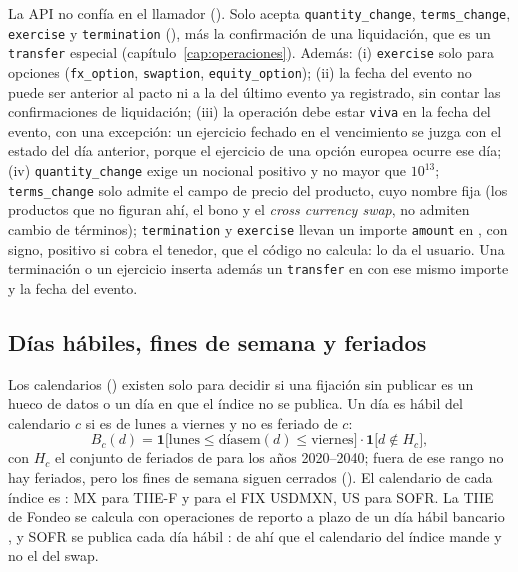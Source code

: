 La API no confía en el llamador (). Solo acepta \texttt{quantity\_change}, \texttt{terms\_change}, \texttt{exercise} y \texttt{termination} (), más la confirmación de una liquidación, que es un \texttt{transfer} especial (capítulo~\ref{cap:operaciones}). Además: (i) \texttt{exercise} solo para opciones (\texttt{fx\_option}, \texttt{swaption}, \texttt{equity\_option}); (ii) la fecha del evento no puede ser anterior al pacto ni a la del último evento ya registrado, sin contar las confirmaciones de liquidación; (iii) la operación debe estar \texttt{viva} en la fecha del evento, con una excepción: un ejercicio fechado en el vencimiento se juzga con el estado del día anterior, porque el ejercicio de una opción europea ocurre ese día; (iv) \texttt{quantity\_change} exige un nocional positivo y no mayor que $10^{13}$; \texttt{terms\_change} solo admite el campo de precio del producto, cuyo nombre fija  (los productos que no figuran ahí, el bono y el \emph{cross currency swap}, no admiten cambio de términos); \texttt{termination} y \texttt{exercise} llevan un importe \texttt{amount} en \MXN, con signo, positivo si cobra el tenedor, que el código no calcula: lo da el usuario. Una terminación o un ejercicio inserta además un \texttt{transfer} en \MXN con ese mismo importe y la fecha del evento.

\subsection{Días hábiles, fines de semana y feriados}\label{sec:cap08-habiles}

Los calendarios () existen solo para decidir si una fijación sin publicar es un hueco de datos o un día en que el índice no se publica. Un día es hábil del calendario $c$ si es de lunes a viernes y no es feriado de $c$:
\begin{equation}\label{eq:cap08-habil}
  B_c(d) = \mathbf{1}\bigl[\text{lunes} \le \text{díasem}(d) \le \text{viernes}\bigr]\cdot\mathbf{1}\bigl[d \notin H_c\bigr],
\end{equation}
con $H_c$ el conjunto de feriados de  para los años 2020--2040; fuera de ese rango no hay feriados, pero los fines de semana siguen cerrados (). El calendario de cada índice es : $\mathrm{MX}$ para TIIE-F y para el FIX USDMXN, $\mathrm{US}$ para SOFR. La TIIE de Fondeo se calcula con operaciones de reporto a plazo de un día hábil bancario \citep{banxico2021}, y SOFR se publica cada día hábil \citep{nyfed2026}: de ahí que el calendario del índice mande y no el del swap.

